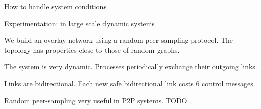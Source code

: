 \documentclass[10pt, xcolor={usenames, dvipsnames}]{beamer}
\begin{document}
\begin{frame}{How to handle system conditions}
  \vspace{-1em}

  \begin{center}
  \begin{minipage}{0.35\textwidth}
    \begin{center}
      
    \end{center}
  \end{minipage}
  \begin{minipage}{0.35\textwidth}
  \vspace{20pt}
    \begin{center}
      
    \end{center}
  \end{minipage}
  \end{center}    

  
\end{frame}



\begin{frame}{Experimentation: in large scale dynamic systems}

  We build an overlay network using a random peer-sampling protocol. The
  topology has properties close to those of random graphs.
  
  \vspace{2em}

  The system is very dynamic. Processes periodically exchange their outgoing links.
  
  \vspace{2em}  

  Links are bidirectional. Each new safe bidirectional link costs 6 control
  messages.
  
  \vspace{2em}

  Random peer-sampling very useful in P2P systems. TODO

\end{frame}
\end{document}
